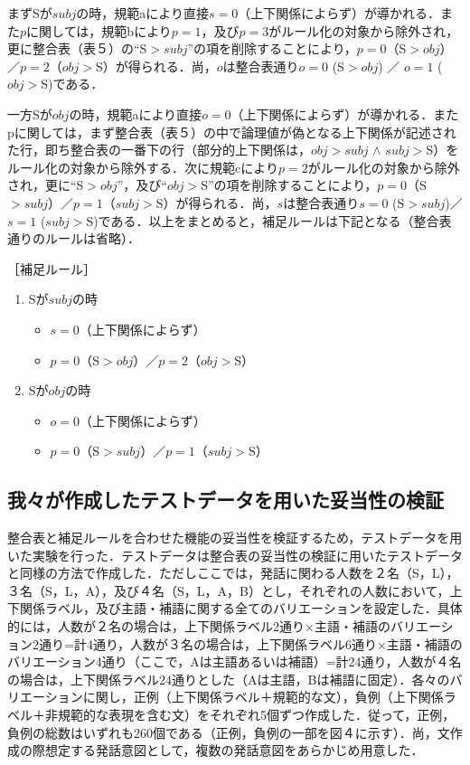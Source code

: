 まずSが$subj$の時，規範aにより直接$s=0$（上下関係によらず）が導かれる．また$p$に関しては，規範bにより$p=1$，及び$p=3$がルール化の対象から除外され，更に整合表（表５）の``S$>subj$''の項を削除することにより，$p=0$（S$>obj$）／$p=2$（$obj>$S）が得られる．尚，$o$は整合表通り$o=0$ (S$>obj$) ／ $o=1$ ($obj>$S)である．

一方Sが$obj$の時，規範aにより直接$o=0$（上下関係によらず）が導かれる．またpに関しては，まず整合表（表５）の中で論理値が偽となる上下関係が記述された行，即ち整合表の一番下の行（部分的上下関係は，$obj>subj$ $\wedge$ $subj>$S）をルール化の対象から除外する．次に規範cにより$p=2$がルール化の対象から除外され，更に``S$>obj$''，及び``$obj>$S''の項を削除することにより，$p=0$（S$>subj$）／$p=1$（$subj>$S）が得られる．尚，$s$は整合表通り$s=0$ (S$>subj$)／$s=1$ ($subj>$S)である．以上をまとめると，補足ルールは下記となる（整合表通りのルールは省略）．

\bigskip

［補足ルール］
\begin{enumerate}
\item Sが$subj$の時
\begin{itemize}
\item $s=0$（上下関係によらず）
\item $p=0$（S$>obj$）／$p=2$（$obj>$S）
\end{itemize}
\item Sが$obj$の時
\begin{itemize}
\item $o=0$（上下関係によらず）
\item $p=0$（S$>subj$）／$p=1$（$subj>$S）
\end{itemize}
\end{enumerate}

\bigskip

\subsection{我々が作成したテストデータを用いた妥当性の検証}
整合表と補足ルールを合わせた機能の妥当性を検証するため，テストデータを用いた実験を行った．テストデータは整合表の妥当性の検証に用いたテストデータと同様の方法で作成した．ただしここでは，発話に関わる人数を２名（S，L），３名（S，L，A），及び４名（S，L，A，B）とし，それぞれの人数において，上下関係ラベル，及び主語・補語に関する全てのバリエーションを設定した．具体的には，人数が２名の場合は，上下関係ラベル2通り×主語・補語のバリエーション2通り=計4通り，人数が３名の場合は，上下関係ラベル6通り×主語・補語のバリエーション4通り（ここで，Aは主語あるいは補語）=計24通り，人数が４名の場合は，上下関係ラベル24通りとした（Aは主語，Bは補語に固定）．各々のバリエーションに関し，正例（上下関係ラベル＋規範的な文），負例（上下関係ラベル＋非規範的な表現を含む文）をそれぞれ5個ずつ作成した．従って，正例，負例の総数はいずれも260個である（正例，負例の一部を図４に示す）．尚，文作成の際想定する発話意図として，複数の発話意図をあらかじめ用意した．

